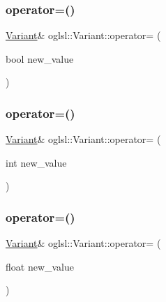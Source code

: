 \subsubsection{\texorpdfstring{operator=()}{operator=()}\hspace{0.1cm}{\footnotesize\ttfamily [2/5]}}
{\footnotesize\ttfamily \mbox{\hyperlink{classoglsl_1_1_variant}{Variant}}\& oglsl\+::\+Variant\+::operator= (\begin{DoxyParamCaption}\item[{bool}]{new\+\_\+value }\end{DoxyParamCaption})\hspace{0.3cm}{\ttfamily [inline]}}

\mbox{\label{classoglsl_1_1_variant_aefcbba97a5c59aba0aaac2b36e70e3e3}} 
\subsubsection{\texorpdfstring{operator=()}{operator=()}\hspace{0.1cm}{\footnotesize\ttfamily [3/5]}}
{\footnotesize\ttfamily \mbox{\hyperlink{classoglsl_1_1_variant}{Variant}}\& oglsl\+::\+Variant\+::operator= (\begin{DoxyParamCaption}\item[{int}]{new\+\_\+value }\end{DoxyParamCaption})\hspace{0.3cm}{\ttfamily [inline]}}

\mbox{\label{classoglsl_1_1_variant_a6343065fd630b414ec29578c981c0859}} 
\subsubsection{\texorpdfstring{operator=()}{operator=()}\hspace{0.1cm}{\footnotesize\ttfamily [4/5]}}
{\footnotesize\ttfamily \mbox{\hyperlink{classoglsl_1_1_variant}{Variant}}\& oglsl\+::\+Variant\+::operator= (\begin{DoxyParamCaption}\item[{float}]{new\+\_\+value }\end{DoxyParamCaption})\hspace{0.3cm}{\ttfamily [inline]}}

